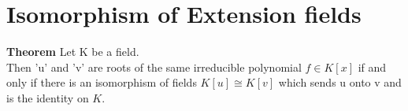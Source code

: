   \section{Isomorphism of Extension fields}
  \textbf{Theorem} \hspace{3mm} Let K be a field.\\
  Then 'u' and 'v' are  roots of the same irreducible polynomial \(f \in K[x]\) if and only if there is an isomorphism of fields \(K[u] \cong K[v]\) which sends u onto v and is the identity on \(K\).\\





